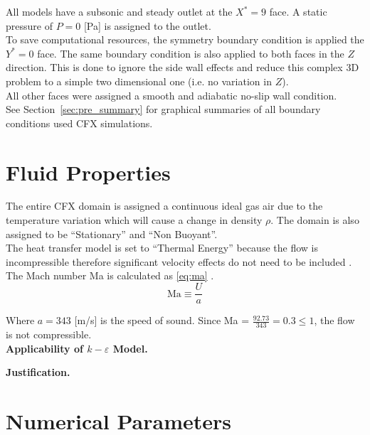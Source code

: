 All models have a subsonic and steady outlet at the $X^*=9$ face. A static pressure of $P=0$ [Pa] is assigned to the outlet.\\

To save computational resources, the symmetry boundary condition is applied the $Y^*=0$ face. The same boundary condition is also applied to both faces in the $Z$ direction. This is done to ignore the side wall effects and reduce this complex 3D problem to a simple two dimensional one (i.e. no variation in $Z$).\\

All other faces were assigned a smooth and adiabatic no-slip wall condition. \\

See Section~\ref{sec:pre_summary} for graphical summaries of all boundary conditions used CFX simulations.
\section{Fluid Properties}
\label{sec:pre_fluid}

The entire CFX domain is assigned a continuous ideal gas air due to the temperature variation which will cause a change in density $\rho$. The domain is also assigned to be ``Stationary'' and ``Non Buoyant''.\\

The heat transfer model is set to ``Thermal Energy'' because the flow is incompressible  therefore significant velocity effects do not need to be included \cite{tut}. The Mach number Ma is calculated as \ref{eq:ma} \cite{fluids}.
\begin{equation}
	\label{eq:ma}
	 \text{Ma}\equiv \frac{U}{a} 
\end{equation}

Where $a=343$ [m/s] is the speed of sound. Since Ma = $\tfrac{92.73}{343}=0.3 \leq 1$, the flow is not compressible.\\

\textbf{Applicability of $k-\varepsilon$ Model.}

\textbf{Justification.}

\section{Numerical Parameters}
\label{sec:pre_num}

